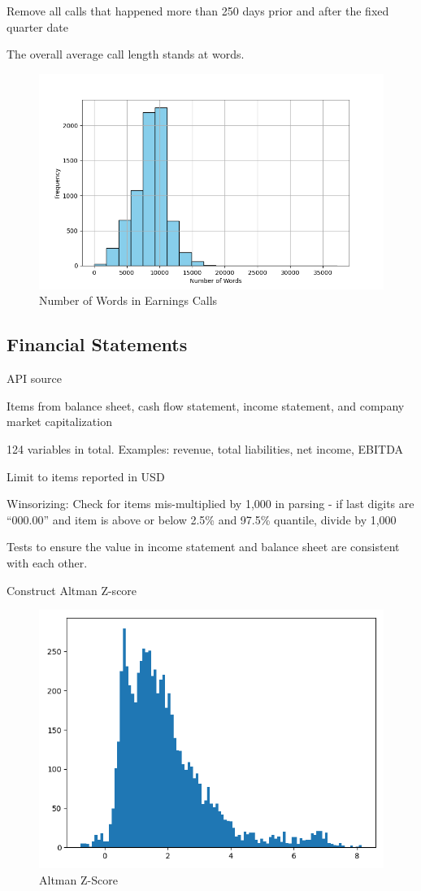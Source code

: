 \documentclass{article}
\begin{document}
    Remove all calls that happened more than 250 days prior and after the fixed quarter date

    The overall average call length stands at \avgCallLength words.

    \begin{figure}[h!]
		\centering
        \caption{Number of Words in Earnings Calls}
        \includegraphics[width=0.5\linewidth,keepaspectratio=true]{../Output/All Data EDA/NLP EDA/all_data_num_words_distribution_no_title.png}
	\end{figure}

    \subsection*{Financial Statements}

    API source

    Items from balance sheet, cash flow statement, income statement, and company market capitalization
    
    124 variables in total. Examples: revenue, total liabilities, net income, EBITDA
    
    Limit to items reported in USD
    
    Winsorizing: Check for items mis-multiplied by 1,000 in parsing - if last digits are “000.00” and item is above or below 2.5\% and 97.5\% quantile, divide by 1,000

    Tests to ensure the value in income statement and balance sheet are consistent with each other.

    Construct Altman Z-score

    \begin{figure}[h!]
		\centering
        \caption{Altman Z-Score}
        \includegraphics[width=0.5\linewidth,keepaspectratio=true]{../Output/All Data EDA/Tabular EDA/altman_z_score_all_data_no_title.png}
	\end{figure}    
\end{document}
